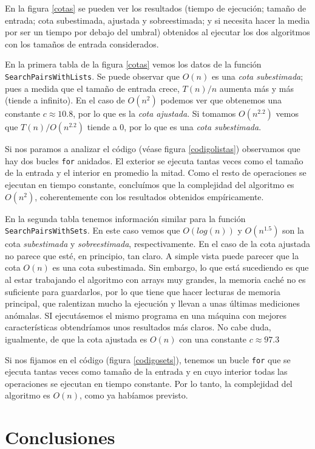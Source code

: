 \documentclass[a4paper, titlepage]{article}
\begin{document}
En la figura \ref{cotas} se pueden ver los resultados (tiempo de ejecución; tamaño de entrada; cota subestimada, ajustada y sobreestimada; y si necesita hacer la media por ser un tiempo por debajo del umbral) obtenidos al ejecutar los dos algoritmos con los tamaños de entrada considerados.


En la primera tabla de la figura \ref{cotas} vemos los datos de la función \texttt{SearchPairsWithLists}. Se puede observar que $O(n)$ es una \emph{cota subestimada}; pues a medida que el tamaño de entrada crece, $T(n)/n$ aumenta más y más (tiende a infinito). En el caso de $O(n^2)$ podemos ver que obtenemos una constante $c \approx 10.8$, por lo que es la \emph{cota ajustada}. Si tomamos $O(n^{2.2})$ vemos que $T(n)/O(n^{2.2})$ tiende a  0, por lo que es una \emph{cota subestimada}.

Si nos paramos a analizar el código (véase figura \ref{codigolistas}) observamos que hay dos bucles \texttt{for} anidados. El exterior se ejecuta tantas veces como el tamaño de la entrada y el interior en promedio la mitad. Como el resto de operaciones se ejecutan en tiempo constante, concluímos que la complejidad del algoritmo es $O(n^2)$, coherentemente con los resultados obtenidos empíricamente.

En la segunda tabla tenemos información similar para la función \texttt{SearchPairsWithSets}. En este caso vemos que $O(log(n))$ y $O(n^{1.5})$ son la cota 	\emph{subestimada} y \emph{sobreestimada}, respectivamente. En el caso de la cota ajustada no parece que esté, en principio, tan claro. A simple vista puede parecer que la cota $O(n)$ es una cota subestimada. Sin embargo, lo que está sucediendo es que al estar trabajando el algoritmo con arrays muy grandes, la memoria caché no es suficiente para guardarlos, por lo que tiene que hacer lecturas de memoria principal, que ralentizan mucho la ejecución y llevan a unas últimas mediciones anómalas. SI ejecutásemos el mismo programa en una máquina con mejores características obtendríamos unos resultados más claros. No cabe duda, igualmente, de que la cota ajustada es $O(n)$ con una constante $c \approx 97.3$

Si nos fijamos en el código (figura \ref{codigosets}), tenemos un bucle \texttt{for} que se ejecuta tantas veces como tamaño de la entrada y en cuyo interior todas las operaciones se ejecutan en tiempo constante. Por lo tanto, la complejidad del algoritmo es $O(n)$, como ya habíamos previsto.

\section{Conclusiones}
\end{document}
